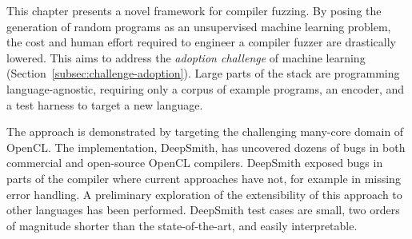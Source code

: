 This chapter presents a novel framework for compiler fuzzing. By posing the generation of random programs as an unsupervised machine learning problem, the cost and human effort required to engineer a compiler fuzzer are drastically lowered. This aims to address the \emph{adoption challenge} of machine learning (Section~\ref{subsec:challenge-adoption}). Large parts of the stack are programming language-agnostic, requiring only a corpus of example programs, an encoder, and a test harness to target a new language.

The approach is demonstrated by targeting the challenging many-core domain of OpenCL. The implementation, DeepSmith, has uncovered dozens of bugs in both commercial and open-source OpenCL compilers. DeepSmith exposed bugs in parts of the compiler where current approaches have not, for example in missing error handling. A preliminary exploration of the extensibility of this approach to other languages has been performed. DeepSmith test cases are small, two orders of magnitude shorter than the state-of-the-art, and easily interpretable.
